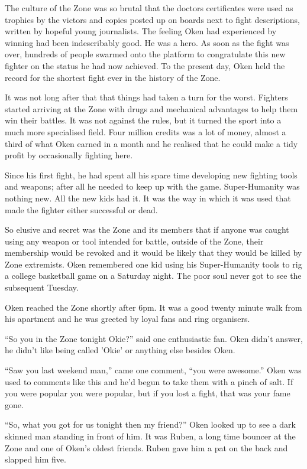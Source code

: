 \thoughtbreak



The culture of the Zone was so brutal that the doctors certificates were used as trophies by the victors and copies posted up on boards next to fight descriptions, written by hopeful young journalists. The feeling Oken had experienced by winning had been indescribably good. He was a hero. As soon as the fight was over, hundreds of people swarmed onto the platform to congratulate this new fighter on the status he had now achieved. To the present day, Oken held the record for the shortest fight ever in the history of the Zone. 

It was not long after that that things had taken a turn for the worst. Fighters started arriving at the Zone with drugs and mechanical advantages to help them win their battles. It was not against the rules, but it turned the sport into a much more specialised field. Four million credits was a lot of money, almost a third of what Oken earned in a month and he realised that he could make a tidy profit by occasionally fighting here. 

Since his first fight, he had spent all his spare time developing new fighting tools and weapons; after all he needed to keep up with the game. Super-Humanity was nothing new. All the new kids had it. It was the way in which it was used that made the fighter either successful or dead. 

So elusive and secret was the Zone and its members that if anyone was caught using any weapon or tool intended for battle, outside of the Zone, their membership would be revoked and it would be likely that they would be killed by Zone extremists. Oken remembered one kid using his Super-Humanity tools to rig a college basketball game on a Saturday night. The poor soul never got to see the subsequent Tuesday.

Oken reached the Zone shortly after 6pm. It was a good twenty minute walk from his apartment and he was greeted by loyal fans and ring organisers.

``So you in the Zone tonight Okie?'' said one enthusiastic fan. Oken didn't answer, he didn't like being called 'Okie' or anything else besides Oken.

``Saw you last weekend man,'' came one comment, ``you were awesome.'' Oken was used to comments like this and he'd begun to take them with a pinch of salt. If you were popular you were popular, but if you lost a fight, that was your fame gone. 

``So, what you got for us tonight then my friend?'' Oken looked up to see a dark skinned man standing in front of him. It was Ruben, a long time bouncer at the Zone and one of Oken's oldest friends. Ruben gave him a pat on the back and slapped him five. 

